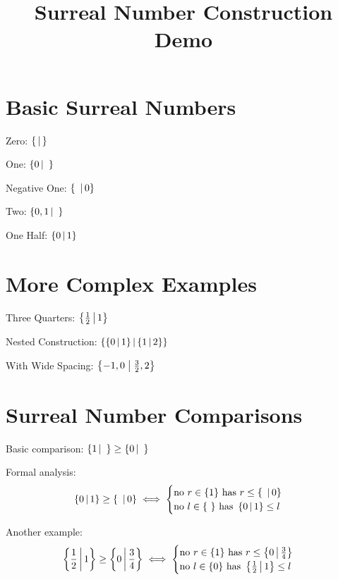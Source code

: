 \documentclass{article}
\begin{document}
\title{Surreal Number Construction Demo}
\maketitle

\section{Basic Surreal Numbers}

\noindent Zero: $\surrealzero$

\noindent One: $\surreal{0}{\ }$

\noindent Negative One: $\surreal{\ }{0}$

\noindent Two: $\surreal{0,1}{\ }$

\noindent One Half: $\surreal{0}{1}$

\section{More Complex Examples}

\noindent Three Quarters: $\surreal{\frac{1}{2}}{1}$

\noindent Nested Construction: $\surreal{\surreal{0}{1}}{\surreal{1}{2}}$

\noindent With Wide Spacing: $\surrealwide{-1, 0}{\frac{3}{2}, 2}$

\section{Surreal Number Comparisons}

\noindent Basic comparison: $\surrealgeqsimple{1}{\  }{0}{\  }$

\noindent Formal analysis:
$$\surrealgeq{0}{1}{\  }{0}$$

\noindent Another example:
$$\surrealgeq{\frac{1}{2}}{1}{0}{\frac{3}{4}}$$
\end{document}
